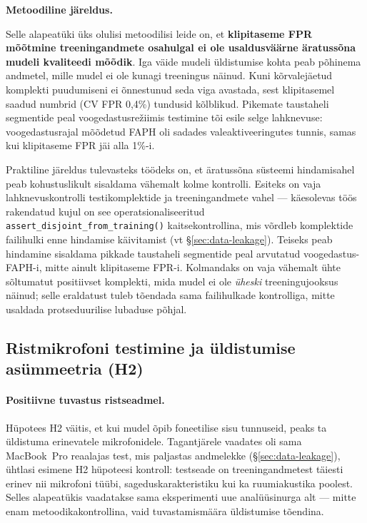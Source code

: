 \medskip
\noindent\textbf{Metoodiline järeldus.}

Selle alapeatüki üks olulisi metoodilisi leide on, et \textbf{klipitaseme FPR mõõtmine treeningandmete osahulgal ei ole usaldusväärne äratussõna mudeli kvaliteedi mõõdik}. Iga väide mudeli üldistumise kohta peab põhinema andmetel, mille mudel ei ole kunagi treeningus näinud. Kuni kõrvalejäetud komplekti puudumiseni ei õnnestunud seda viga avastada, sest klipitasemel saadud numbrid (CV FPR 0,4\%) tundusid kõlblikud. Pikemate taustaheli segmentide peal voogedastusrežiimis testimine tõi esile selge lahknevuse: voogedastusrajal mõõdetud FAPH oli sadades valeaktiveeringutes tunnis, samas kui klipitaseme FPR jäi alla 1\%-i.

Praktiline järeldus tulevasteks töödeks on, et äratussõna süsteemi hindamisahel peab kohustuslikult sisaldama vähemalt kolme kontrolli. Esiteks on vaja lahknevuskontrolli testikomplektide ja treeningandmete vahel --- käesolevas töös rakendatud kujul on see operatsionaliseeritud \texttt{assert\_disjoint\_from\_training()} kaitsekontrollina, mis võrdleb komplektide failihulki enne hindamise käivitamist (vt §\ref{sec:data-leakage}). Teiseks peab hindamine sisaldama pikkade taustaheli segmentide peal arvutatud voogedastus-FAPH-i, mitte ainult klipitaseme FPR-i. Kolmandaks on vaja vähemalt ühte sõltumatut positiivset komplekti, mida mudel ei ole \emph{üheski} treeningujooksus näinud; selle eraldatust tuleb tõendada sama failihulkade kontrolliga, mitte usaldada protseduurilise lubaduse põhjal.

\subsection{Ristmikrofoni testimine ja üldistumise asümmeetria (H2)}
\label{sec:cross-mic-h2}

\paragraph{Positiivne tuvastus ristseadmel.}
Hüpotees H2 väitis, et kui mudel õpib foneetilise sisu tunnuseid, peaks ta üldistuma erinevatele mikrofonidele. Tagantjärele vaadates oli sama MacBook~Pro reaalajas test, mis paljastas andmelekke (§\ref{sec:data-leakage}), ühtlasi esimene H2 hüpoteesi kontroll: testseade on treeningandmetest täiesti erinev nii mikrofoni tüübi, sageduskarakteristiku kui ka ruumiakustika poolest. Selles alapeatükis vaadatakse sama eksperimenti uue analüüsinurga alt --- mitte enam metoodikakontrollina, vaid tuvastamismäära üldistumise tõendina.

